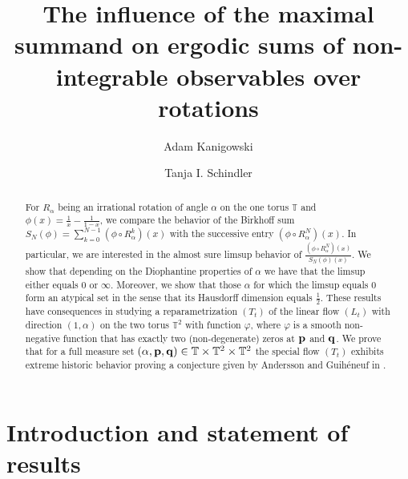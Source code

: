 \documentclass[11pt]{amsart}
\title[Ergodic sums over rotations for non-integrable observables]{The influence of the maximal summand on ergodic sums of non-integrable observables over rotations}
\author{Adam Kanigowski}
\author{Tanja I. Schindler}
\theoremstyle{definition}
\numberwithin{equation}{section}
\def\T{\mathbb{T}}
\begin{document}
\begin{abstract}
 For $R_{\alpha}$ being an irrational rotation of angle $\alpha$ on the one torus $\T$ and $\phi(x)=\frac{1}{x}-\frac{1}{1-x}$, we compare the behavior of the Birkhoff sum $S_N(\phi)=\sum_{k=0}^{N-1}(\phi\circ R_{\alpha}^k)(x)$ with the successive entry $(\phi\circ R_{\alpha}^N)(x)$. In particular, we are interested in the almost sure limsup behavior of $\frac{(\phi\circ R_{\alpha}^N)(x)}{S_N(\phi)(x)}$. We show that depending on the Diophantine properties of $\alpha$ we have that the limsup either equals $0$ or $\infty$. Moreover, we show that those $\alpha$ for which the limsup equals $0$ form an atypical set in the sense that its Hausdorff dimension equals $\frac{1}{2}$. 
These results have consequences in studying a reparametrization $(T_t)$ of the  linear flow $(L_t)$ with direction $(1,\alpha)$ on the two torus $\T^2$ with function $\varphi$, where $\varphi$ is a smooth non-negative function that has exactly two (non-degenerate) zeros at $\bf p$ and $\bf q$. 
We prove that for a full measure set $(\alpha, {\bf p}, {\bf q})\in \T\times \T^2\times \T^2$ 
the special flow $(T_t)$ exhibits extreme historic behavior proving a conjecture given by Andersson and Guih\'eneuf in \cite{An-Gu}. 
\end{abstract}





\maketitle



\section{Introduction and statement of results}
\end{document}

